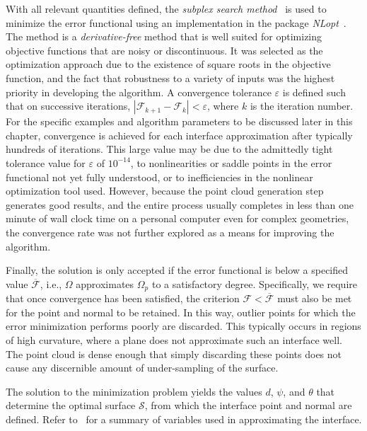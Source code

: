 With all relevant quantities defined, the \textit{subplex search method}~\cite{rowan} is used to minimize the error functional using an implementation in the package \textit{NLopt}~\cite{nlo}. The method is a \textit{derivative-free} method that is well suited for optimizing objective functions that are noisy or discontinuous. It was selected as the optimization approach due to the existence of square roots in the objective function, and the fact that robustness to a variety of inputs was the highest priority in developing the algorithm. A convergence tolerance $\varepsilon$ is defined such that on successive iterations, $\left| \mathcal{F}_{k+1} - \mathcal{F}_{k}\right| < \varepsilon$, where $k$ is the iteration number. For the specific examples and algorithm parameters to be discussed later in this chapter, convergence is achieved for each interface approximation after typically hundreds of iterations. This large value may be due to the admittedly tight tolerance value for $\varepsilon$ of $10^{-14}$, to nonlinearities or saddle points in the error functional not yet fully understood, or to inefficiencies in the nonlinear optimization tool used. However, because the point cloud generation step generates good results, and the entire process usually completes in less than one minute of wall clock time on a personal computer even for complex geometries, the convergence rate was not further explored as a means for improving the algorithm.

Finally, the solution is only accepted if the error functional is below a specified value $\overline{\mathcal{F}}$, i.e., $\Omega$ approximates $\Omega_p$ to a satisfactory degree. Specifically, we require that once convergence has been satisfied, the criterion $\mathcal{F} < \overline{\mathcal{F}}$ must also be met for the point and normal to be retained. In this way, outlier points for which the error minimization performs poorly are discarded. This typically occurs in regions of high curvature, where a plane does not approximate such an interface well. The point cloud is dense enough that simply discarding these points does not cause any discernible amount of under-sampling of the surface.

The solution to the minimization problem yields the values $d$, $\psi$, and $\theta$ that determine the optimal surface $\mathcal{S}$, from which the interface point and normal are defined. Refer to~ for a summary of variables used in approximating the interface.

